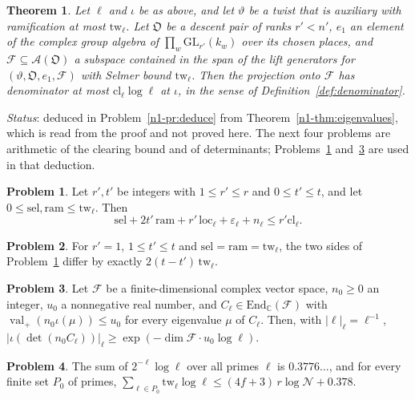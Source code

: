 \documentclass[reqno]{amsart}
\theoremstyle{definition}
\newtheorem{problem}{Problem}[section]
\theoremstyle{plain}
\newtheorem{theorem}{Theorem}[section]
\newcommand{\C}{\mathbb{C}}
\newcommand{\GL}{\mathrm{GL}}
\newcommand{\DP}{\mathfrak{O}}
\newcommand{\val}{\operatorname{val}}
\newcommand{\cl}{\mathrm{cl}}
\newcommand{\loc}{\mathrm{loc}}
\begin{document}
\begin{theorem}\label{thm:denominators}
Let \(\ell\) and \(\iota\) be as above, and let \(\vartheta\) be a twist that is auxiliary with ramification at most \(\mathrm{tw}_\ell\).  Let \(\DP\) be a descent pair of ranks \(r' < n'\), \(e_1\) an element of the complex group algebra of \(\prod_w \GL_{r'}(k_w)\) over its chosen places, and \(\mathcal F \subseteq \mathcal A(\DP)\) a subspace contained in the span of the lift generators for \((\vartheta, \DP, e_1, \mathcal F)\) with Selmer bound \(\mathrm{tw}_\ell\).  Then the projection onto \(\mathcal F\) has denominator at most \(\cl_\ell \log \ell\) at \(\iota\), in the sense of Definition~\ref{def:denominator}.
\end{theorem}

\emph{Status}: deduced in Problem~\ref{n1-pr:deduce} from Theorem~\ref{n1-thm:eigenvalues}, which is read from the proof \cite{GL} and not proved here.  The next four problems are arithmetic of the clearing bound and of determinants; Problems~\ref{pr:budget} and~\ref{pr:det-bound} are used in that deduction.

\begin{problem}\label{pr:budget}
Let \(r', t'\) be integers with \(1 \le r' \le r\) and \(0 \le t' \le t\), and let \(0 \le \mathrm{sel}, \mathrm{ram} \le \mathrm{tw}_\ell\).  Then
\[
  \mathrm{sel} + 2t'\,\mathrm{ram} + r'\,\loc_\ell + \varepsilon_\ell + n_\ell \le r'\cl_\ell .
\]
\end{problem}

\begin{problem}\label{pr:rank-one-budget}
For \(r' = 1\), \(1 \le t' \le t\) and \(\mathrm{sel} = \mathrm{ram} = \mathrm{tw}_\ell\), the two sides of Problem~\ref{pr:budget} differ by exactly \(2(t - t')\,\mathrm{tw}_\ell\).
\end{problem}

\begin{problem}\label{pr:det-bound}
Let \(\mathcal F\) be a finite-dimensional complex vector space, \(n_0 \ge 0\) an integer, \(u_0\) a nonnegative real number, and \(C_\ell \in \mathrm{End}_{\C}(\mathcal F)\) with \(\val_+(n_0\iota(\mu)) \le u_0\) for every eigenvalue \(\mu\) of \(C_\ell\).  Then, with \(\lvert \ell \rvert_\ell = \ell^{-1}\), \(\lvert \iota(\det(n_0C_\ell)) \rvert_\ell \ge \exp(-\dim \mathcal F \cdot u_0 \log \ell)\).
\end{problem}

\begin{problem}\label{pr:negligible}
The sum of \(2^{-\ell}\log \ell\) over all primes \(\ell\) is \(0.3776\ldots\), and for every finite set \(P_0\) of primes, \(\sum_{\ell \in P_0} \mathrm{tw}_\ell \log \ell \le (4f + 3)\,r \log \mathcal N + 0.378\).
\end{problem}
\end{document}
